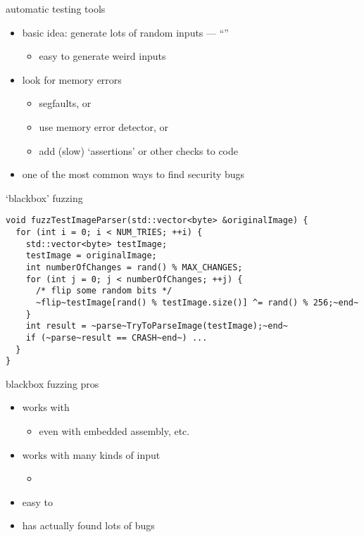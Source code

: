 \begin{frame}{automatic testing tools}
    \begin{itemize}
        \item basic idea: generate lots of random inputs --- ``''
            \begin{itemize}
            \item easy to generate weird inputs
            \end{itemize}
        \item look for memory errors
            \begin{itemize}
            \item segfaults, or
            \item use memory error detector, or
            \item add (slow) `assertions' or other checks to code
            \end{itemize}
        \vspace{.5cm}
        \item one of the most common ways to find security bugs
    \end{itemize}
\end{frame}

\begin{frame}[fragile,label=bbFuzz]{`blackbox' fuzzing}
\begin{lstlisting}
void fuzzTestImageParser(std::vector<byte> &originalImage) {
  for (int i = 0; i < NUM_TRIES; ++i) {
    std::vector<byte> testImage;
    testImage = originalImage;
    int numberOfChanges = rand() % MAX_CHANGES;
    for (int j = 0; j < numberOfChanges; ++j) {
      /* flip some random bits */
      ~flip~testImage[rand() % testImage.size()] ^= rand() % 256;~end~
    }
    int result = ~parse~TryToParseImage(testImage);~end~
    if (~parse~result == CRASH~end~) ...
  }
}
\end{lstlisting}
\end{frame}

\begin{frame}{blackbox fuzzing pros}
    \begin{itemize}
        \item works with 
        \begin{itemize}
            \item even with embedded assembly, etc.
        \end{itemize}
    \item works with many kinds of input
        \begin{itemize}
            \item {}
        \end{itemize}
    \item easy to 
        \vspace{.5cm}
    \item has actually found lots of bugs
    \end{itemize}
\end{frame}

